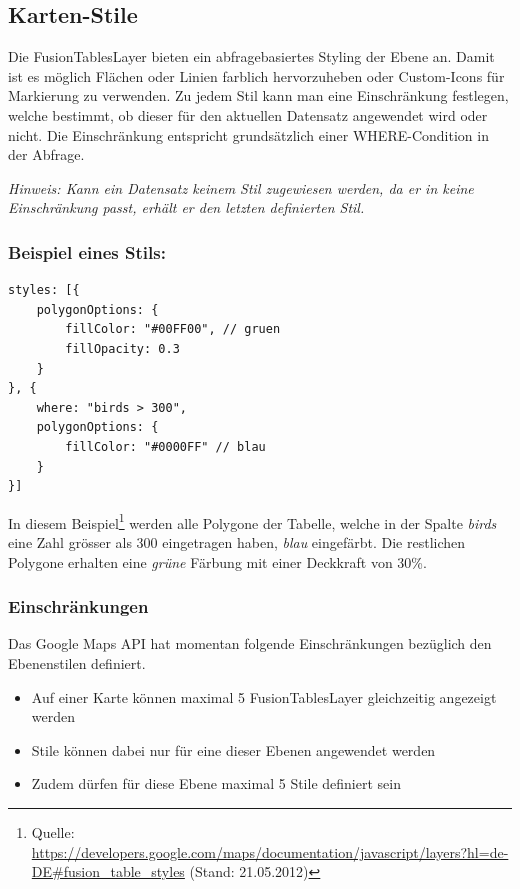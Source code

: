 \subsection{Karten-Stile}
Die FusionTablesLayer bieten ein abfragebasiertes Styling der Ebene an. Damit ist es möglich Flächen oder Linien farblich hervorzuheben oder Custom-Icons für Markierung zu verwenden. Zu jedem Stil kann man eine Einschränkung festlegen, welche bestimmt, ob dieser für den aktuellen Datensatz angewendet wird oder nicht. Die Einschränkung entspricht grundsätzlich einer WHERE-Condition in der Abfrage.

\emph{Hinweis: Kann ein Datensatz keinem Stil zugewiesen werden, da er in keine Einschränkung passt, erhält er den letzten definierten Stil.}

\subsubsection{Beispiel eines Stils:}
\lstset{language=JavaScript}
\begin{lstlisting}
styles: [{
	polygonOptions: {
		fillColor: "#00FF00", // gruen
		fillOpacity: 0.3
	}
}, {
	where: "birds > 300",
	polygonOptions: {
		fillColor: "#0000FF" // blau
	}
}]
\end{lstlisting}

In diesem Beispiel\footnote{Quelle: \url{https://developers.google.com/maps/documentation/javascript/layers?hl=de-DE\#fusion_table_styles} (Stand: 21.05.2012)} werden alle Polygone der Tabelle, welche in der Spalte \emph{birds} eine Zahl grösser als 300 eingetragen haben, \emph{blau} eingefärbt. Die restlichen Polygone erhalten eine \emph{grüne} Färbung mit einer Deckkraft von 30\%.

\subsubsection{Einschränkungen}
\label{fusiontableslayer-styles-restrictions}
Das Google Maps API hat momentan folgende Einschränkungen bezüglich den Ebenenstilen definiert.

\begin{itemize}
\item Auf einer Karte können maximal 5 FusionTablesLayer gleichzeitig angezeigt werden
\item Stile können dabei nur für eine dieser Ebenen angewendet werden
\item Zudem dürfen für diese Ebene maximal 5 Stile definiert sein
\end{itemize}

